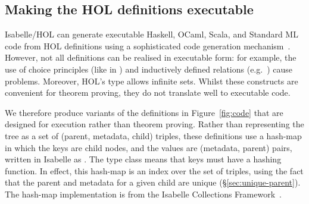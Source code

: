\documentclass[sigplan,anonymous]{acmart}
\begin{document}
\subsection{Making the HOL definitions executable} \label{subsect.extracting}

Isabelle/HOL can generate executable Haskell, OCaml, Scala, and Standard ML code from HOL definitions using a sophisticated code generation mechanism~\cite{DBLP:conf/flops/HaftmannN10}.
However, not all definitions can be realised in executable form: for example, the use of choice principles (like in ) and inductively defined relations (e.g.\ ) cause problems.
Moreover, HOL's  type allows infinite sets.
Whilst these constructs are convenient for theorem proving, they do not translate well to executable code.

We therefore produce variants of the definitions in Figure~\ref{fig:code} that are designed for execution rather than theorem proving.
Rather than representing the tree as a set of (parent, metadata, child) triples, these definitions use a hash-map in which the keys are child nodes, and the values are (metadata, parent) pairs, written in Isabelle as .
The  type class means that keys must have a hashing function.
In effect, this hash-map is an index over the set of triples, using the fact that the parent and metadata for a given child are unique (\S\ref{sec:unique-parent}).
The hash-map implementation is from the Isabelle Collections Framework~\cite{DBLP:conf/itp/LammichL10}.
\end{document}

